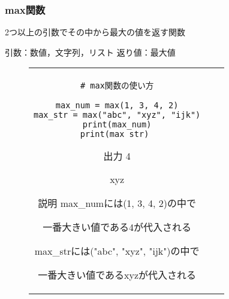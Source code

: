 \documentclass{jsarticle}
\begin{document}
\subsubsection{max関数}
2つ以上の引数でその中から最大の値を返す関数 \par
引数：数値，文字列，リスト \hspace{5mm}
返り値：最大値
\vspace{-5mm}
\begin{figure}[h]
	\begin{tabular}{ccc}
		\begin{minipage}[t]{.4\textwidth}
			\begin{lstlisting}[caption=max関数]
# max関数の使い方

max_num = max(1, 3, 4, 2)
max_str = max("abc", "xyz", "ijk")
print(max_num)
print(max_str) \end{lstlisting}
		\end{minipage} \hspace{5mm}
		\begin{minipage}[t]{.1\textwidth}
			\begin{itembox}[l]{出力}
				4 \par
				xyz \par
			\end{itembox}
		\end{minipage} \hspace{5mm}
		\begin{minipage}[t]{.45\textwidth}
			\begin{itembox}[l]{説明}
				max\_numには(1, 3, 4, 2)の中で\par 一番大きい値である4が代入される \par
				max\_strには("abc", "xyz", "ijk")の中で \par 一番大きい値であるxyzが代入される
			\end{itembox}
		\end{minipage}
	\end{tabular}
\end{figure}
\newpage
\end{document}
